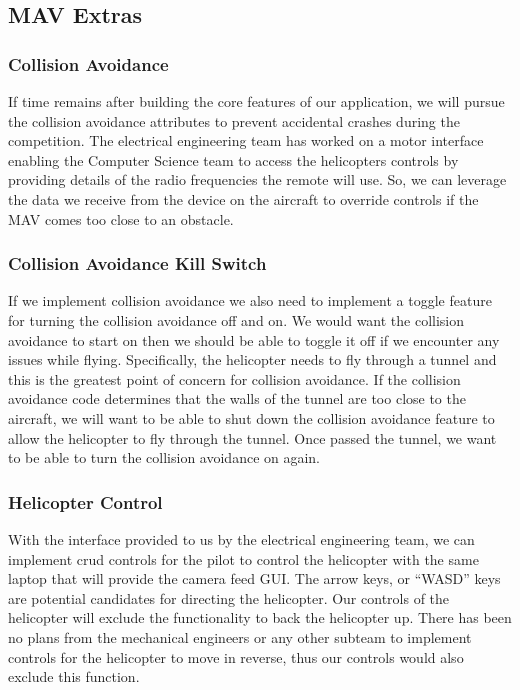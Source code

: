 \documentclass[onecolumn, oneside, letterpaper, draftclsnofoot, 10pt, compsoc]{IEEEtran}
\begin{document}
\subsection{MAV Extras}

\subsubsection{Collision Avoidance}
If time remains after building the core features of our application, we will pursue the collision avoidance attributes to prevent accidental crashes during the competition. The electrical engineering team has worked on a motor interface enabling the Computer Science team to access the helicopter\textquotesingle s controls by providing details of the radio frequencies the remote will use. So, we can leverage the data we receive from the device on the aircraft to override controls if the MAV comes too close to an obstacle.

\subsubsection{Collision Avoidance Kill Switch}
If we implement collision avoidance we also need to implement a toggle feature for turning the collision avoidance off and on. We would want the collision avoidance to start on then we should be able to toggle it off if we encounter any issues while flying. Specifically, the helicopter needs to fly through a tunnel and this is the greatest point of concern for collision avoidance. If the collision avoidance code determines that the walls of the tunnel are too close to the aircraft, we will want to be able to shut down the collision avoidance feature to allow the helicopter to fly through the tunnel. Once passed the tunnel, we want to be able to turn the collision avoidance on again.

\subsubsection{Helicopter Control}
With the interface provided to us by the electrical engineering team, we can implement crud controls for the pilot to control the helicopter with the same laptop that will provide the camera feed GUI. The arrow keys, or ``WASD'' keys are potential candidates for directing the helicopter. Our controls of the helicopter will exclude the functionality to back the helicopter up. There has been no plans from the mechanical engineers or any other subteam to implement controls for the helicopter to move in reverse, thus our controls would also exclude this function.
\end{document}
